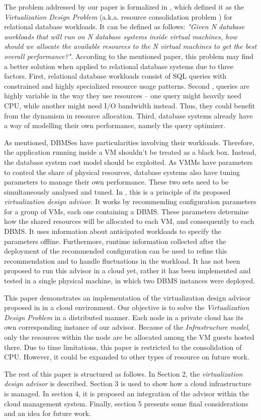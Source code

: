 The problem addressed by our paper is formalized in \cite{4401021}, which defined it as the \textit{Virtualization Design Problem} (a.k.a. resource consolidation problem ) for relational database workloads. It can be defined as follows: \textit{"Given N database workloads that will run on N database systems inside virtual 
machines, how should we allocate the available resources to the N virtual machines to get the best overall performance?"}. According to the mentioned paper, this problem may find a better solution when applied to relational database systems due to three factors. First, relational database workloads consist of SQL queries with constrained and highly specialized resource usage patterns. Second , queries are highly variable in the way they use resources -- one query might heavily need CPU, while another might need I/O bandwidth instead. Thus, they could benefit from the dynamism in resource allocation. Third, database systems already have a way of modelling their own performance, namely the query optimizer.

As mentioned, DBMSes have particularities involving their workloads. Therefore, the application running inside a VM shouldn't be treated as a black box. Instead, the database system cost model should be exploited. As VMMs have parameters to control the share of physical resources, database systems also have tuning parameters to manage their own performance. These two sets need to be simultaneously analysed and tuned. In \cite{Soror:2008:AVM:1376616.1376711}, this is a principle of its proposed \textit{virtualization design advisor}. It works by recommending configuration parameters for a group of VMs, each one containing a DBMS. These parameters determine how the shared resources will be allocated to each VM, and consequently to each DBMS. It uses information about anticipated workloads to specify the parameters offline. Furthermore, runtime information collected after the deployment of the recommended configuration can be used to refine this recommendation and to handle fluctuations in the workload. It has not been proposed to run this advisor in a cloud yet, rather it has been implemented and tested in a single physical machine, in which two DBMS instances were deployed.

This paper demonstrates an implementation of the virtualization design advisor proposed in \cite{Soror:2008:AVM:1376616.1376711} in a cloud environment. Our objective is to solve the \textit{Virtualization Design Problem} in a distributed manner. Each node in a private cloud has its own corresponding instance of our advisor. Because of the \textit{Infrastructure model}, only the resources within the node are be allocated among the VM guests hosted there. Due to time limitations, this paper is restricted to the consolidation of CPU. However, it could be expanded to other types of resource on future work. 

The rest of this paper is structured as follows. In Section 2, the \textit{virtualization design advisor} is described. Section 3 is used to show how a cloud infrastructure is managed. In section 4, it is proposed an integration of the advisor within the cloud management system. Finally, section 5 presents some final considerations and an idea for future work.

